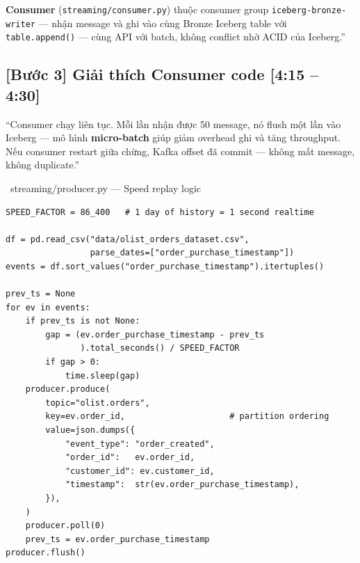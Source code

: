 \documentclass[12pt, a4paper]{article}
\newenvironment{speakerbox}[2]{%
  \begin{tcolorbox}[
    enhanced, breakable,
    colback=#1!6!white, colframe=#1,
    colbacktitle=#1, coltitle=white,
    fonttitle=\bfseries\large,
    title={#2},
    arc=4pt, boxrule=1.5pt,
    left=8pt, right=8pt, top=6pt, bottom=6pt,
  ]
}{\end{tcolorbox}}
\newcommand{\timing}[1]{\hfill{\small\bfseries\color{gray}[#1]}}
\newcommand{\code}[1]{\texttt{\small#1}}
\begin{document}
\begin{speakerbox}{p2color}{\faUser\ Người 2 \textbullet\ 3:40 -- 4:30 \textbullet\ DEMO + Lời nói}
\begin{scriptbox}
\textbf{Consumer} (\code{streaming/consumer.py}) thuộc consumer group
\code{iceberg-bronze-writer} --- nhận message và ghi vào cùng Bronze Iceberg
table với \code{table.append()} --- cùng API với batch, không conflict nhờ
ACID của Iceberg.''
\end{scriptbox}

\subsection*{[Bước 3] Giải thích Consumer code \timing{4:15 -- 4:30}}

\begin{scriptbox}
``Consumer chạy liên tục. Mỗi lần nhận được 50 message, nó flush
một lần vào Iceberg --- mô hình \textbf{micro-batch} giúp giảm overhead ghi
và tăng throughput. Nếu consumer restart giữa chừng, Kafka offset đã
commit --- không mất message, không duplicate.''
\end{scriptbox}

\end{speakerbox}

\vspace{0.5em}

\begin{codebox}{\faCode\ streaming/producer.py --- Speed replay logic}
\begin{verbatim}
SPEED_FACTOR = 86_400   # 1 day of history = 1 second realtime

df = pd.read_csv("data/olist_orders_dataset.csv",
                 parse_dates=["order_purchase_timestamp"])
events = df.sort_values("order_purchase_timestamp").itertuples()

prev_ts = None
for ev in events:
    if prev_ts is not None:
        gap = (ev.order_purchase_timestamp - prev_ts
               ).total_seconds() / SPEED_FACTOR
        if gap > 0:
            time.sleep(gap)
    producer.produce(
        topic="olist.orders",
        key=ev.order_id,                     # partition ordering
        value=json.dumps({
            "event_type": "order_created",
            "order_id":   ev.order_id,
            "customer_id": ev.customer_id,
            "timestamp":  str(ev.order_purchase_timestamp),
        }),
    )
    producer.poll(0)
    prev_ts = ev.order_purchase_timestamp
producer.flush()
\end{verbatim}
\end{codebox}
\end{document}
